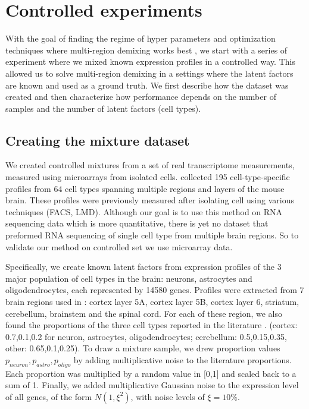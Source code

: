 
\section{Controlled experiments}
\label{Synthetic_exp}

With the goal of finding the regime of hyper parameters and optimization techniques where multi-region demixing works best , we start with a series of experiment where we mixed known expression profiles in a controlled way. This allowed us to solve multi-region demixing in a settings where the latent factors are known and used as a ground truth. We first describe how the dataset was created and then characterize how performance depends on the number of samples and the number of latent factors (cell types).

\subsection{Creating the mixture dataset}
We created controlled mixtures from a set of real transcriptome measurements, measured using microarrays from isolated cells. \citet{okaty2011cell} collected 195 cell-type-specific profiles from 64 cell types spanning multiple regions and layers of the mouse brain. These profiles were previously measured after isolating cell using various techniques (FACS, LMD). Although our goal is to use this method on RNA sequencing data which is more quantitative, there is yet no dataset that preformed RNA sequencing of single cell type from multiple brain regions. So to validate our method on controlled set we use microarray data.
 
Specifically, we create known latent factors from expression profiles of the 3 major population of cell types in the brain: neurons, astrocytes and oligodendrocytes, each represented by 14580 genes. Profiles were extracted from 7 brain regions used in \citet{doyle2008}:  cortex layer 5A, cortex layer 5B, cortex layer 6, striatum, cerebellum, brainstem and the spinal cord. For each of these region, we also found the proportions of the three cell types reported in the literature \cite{Herculano2014}. (cortex:  0.7,0.1,0.2 for neuron, astrocytes, oligodendrocytes; cerebellum: 0.5,0.15,0.35, other: 0.65,0.1,0.25). To draw a mixture sample, we drew proportion values $p_{neuron},p_{astro},p_{oligo}$ by adding multiplicative noise to the literature proportions. Each proportion was multiplied by a random value in [0,1] and scaled back to a  sum of 1. Finally, we added multiplicative Gaussian noise to the expression level of all genes, of the form $N(1,\xi^2)$, with noise levels of $\xi=10\%$.

